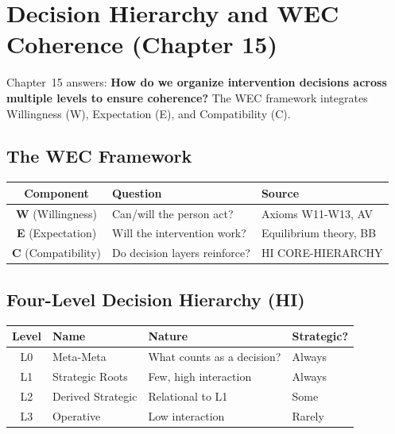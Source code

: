 \section{Decision Hierarchy and WEC Coherence (Chapter 15)}
\label{sec:mp-wec}

Chapter~15 answers: \textbf{How do we organize intervention decisions across multiple levels to ensure coherence?} The WEC framework integrates Willingness (W), Expectation (E), and Compatibility (C).

\subsection{The WEC Framework}

\begin{center}
\renewcommand{\arraystretch}{1.2}
\begin{tabular}{@{}clp{5cm}@{}}
\toprule
\textbf{Component} & \textbf{Question} & \textbf{Source} \\
\midrule
\textbf{W} (Willingness) & Can/will the person act? & Axioms W11-W13, AV \\
\textbf{E} (Expectation) & Will the intervention work? & Equilibrium theory, BB \\
\textbf{C} (Compatibility) & Do decision layers reinforce? & HI CORE-HIERARCHY \\
\bottomrule
\end{tabular}
\end{center}

\subsection{Four-Level Decision Hierarchy (HI)}

\begin{center}
\renewcommand{\arraystretch}{1.2}
\begin{tabular}{@{}clll@{}}
\toprule
\textbf{Level} & \textbf{Name} & \textbf{Nature} & \textbf{Strategic?} \\
\midrule
L0 & Meta-Meta & What counts as a decision? & Always \\
L1 & Strategic Roots & Few, high interaction & Always \\
L2 & Derived Strategic & Relational to L1 & Some \\
L3 & Operative & Low interaction & Rarely \\
\bottomrule
\end{tabular}
\end{center}

